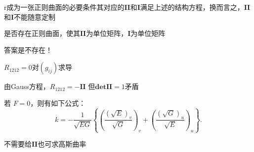 \documentclass[lang=cn,10pt,thmcnt=section]{elegantbook}
\begin{document}
r成为一张正则曲面的必要条件其对应的$\mathbf{ II}$和$\mathbf{ I}$满足上述的结构方程，换而言之，$\mathbf{ II}$和$\mathbf{ I}$不能随意定制

\begin{example}
    是否存在正则曲面，使其$\mathbf{ II}$为单位矩阵，$\mathbf{ I}$为单位矩阵
\end{example}
答案是不存在！

$R_{1212}=0$对$(g_{ij})$求导

由Gauss方程，$R_{1212}=-\mathbf{ II}$
但$\mathbf{det II}=1$矛盾

\begin{proposition}
    若 $F=0$，则有如下公式：
\[
k = -\frac{1}{\sqrt{EG}}\left\{\left(\frac{(\sqrt{E})_v}{\sqrt{G}}\right)_v + \left(\frac{(\sqrt{G})_u}{\sqrt{E}}\right)_u\right\}.
\]
\end{proposition}
\begin{remark}
    不需要给$\mathbf{ II}$也可求高斯曲率
\end{remark}
\end{document}
